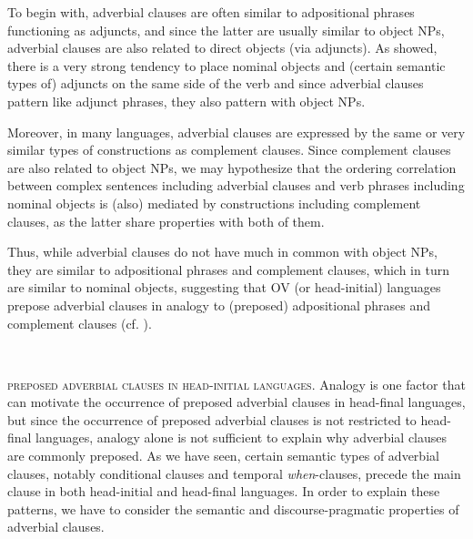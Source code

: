 \documentclass[output=paper]{langsci/langscibook}
\begin{document}
To begin with, adverbial clauses are often similar to adpositional phrases functioning as adjuncts, and since the latter are usually similar to object NPs, adverbial clauses are also related to direct objects (via adjuncts). As \citet{Dryer1992} showed, there is a very strong tendency to place nominal objects and (certain semantic types of) adjuncts on the same side of the verb and since adverbial clauses pattern like adjunct phrases, they also pattern with object NPs. 

Moreover, in many languages, adverbial clauses are expressed by the same or very similar types of constructions as complement clauses. Since complement clauses are also related to object NPs, we may hypothesize that the ordering correlation between complex sentences including adverbial clauses and verb phrases including nominal objects is (also) mediated by constructions including complement clauses, as the latter share properties with both of them.

Thus, while adverbial clauses do not have much in common with object NPs, they are similar to adpositional phrases and complement clauses, which in turn are similar to nominal objects, suggesting that OV (or head-initial) languages prepose adverbial clauses in analogy to (preposed) adpositional phrases and complement clauses (cf. ).

\ea\label{ex:diessel:17}~\\
\z

\textsc{preposed} \textsc{adverbial} \textsc{clauses} \textsc{in} \textsc{head-initial} \textsc{languages}. Analogy is one factor that can motivate the occurrence of preposed adverbial clauses in head-final languages, but since the occurrence of preposed adverbial clauses is not restricted to head-final languages, analogy alone is not sufficient to explain why adverbial clauses are commonly preposed. As we have seen, certain semantic types of adverbial clauses, notably conditional clauses and temporal \textit{when}-clauses, precede the main clause in both head-initial and head-final languages. In order to explain these patterns, we have to consider the semantic and discourse-pragmatic properties of adverbial clauses.
\end{document}
